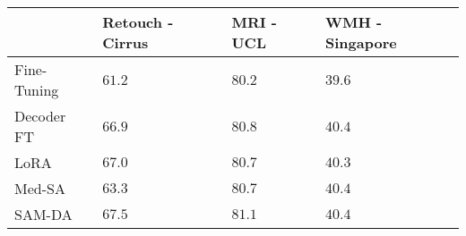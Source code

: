 \begin{table}
\centering
\begin{tabular}{@{}p{3cm}P{2.4cm}P{2cm}P{2.6cm}@{}}
\toprule
 & Retouch - Cirrus & MRI - UCL & WMH - Singapore \\ \midrule
Fine-Tuning & $61.2$ & $80.2$ & $39.6$ \\
Decoder FT & $66.9$ & $80.8$ & $40.4$ \\
LoRA~{\footnotesize\parencite{hu2022lora}} & $67.0$ & $80.7$ & $40.3$ \\
Med-SA~{\footnotesize\parencite{wu2023medical}} & $63.3$ & $80.7$ & $40.4$ \\ \midrule
SAM-DA & $\mathbf{67.5}$ & $\mathbf{81.1}$ & $\mathbf{40.4}$ \\ \bottomrule
\end{tabular}
\end{table}
